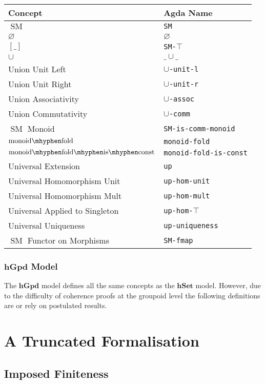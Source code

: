 \documentclass[12pt, parskip, DIV=14]{scrbook}
\newcommand{\SM}{\operatorname{SM}}
\newcommand{\hSet}{\mathbf{hSet}}
\newcommand{\hGpd}{\mathbf{hGpd}}
\newcommand{\monfold}{\operatorname{monoid\mhyphen fold}}
\newcommand{\monfoldconst}{\operatorname{monoid\mhyphen fold\mhyphen is\mhyphen const}}
\begin{document}
\begin{center}
\begin{tabular}{ll}
  Concept & Agda Name \\
  \hline
  $\SM$ & \texttt{SM} \\
  $\varnothing$ & $\varnothing$ \\
  $[\_]$ & \texttt{SM-$\top$} \\
  $\cup$ & $\_\cup\_$ \\
  Union Unit Left & \texttt{$\cup$-unit-l} \\
  Union Unit Right & \texttt{$\cup$-unit-r} \\
  Union Associativity & \texttt{$\cup$-assoc} \\
  Union Commutativity & \texttt{$\cup$-comm} \\
  $\SM$ Monoid & \texttt{SM-is-comm-monoid} \\
  $\monfold$ & \texttt{monoid-fold} \\
  $\monfoldconst$ & \texttt{monoid-fold-is-const} \\
  Universal Extension & \texttt{up} \\
  Universal Homomorphism Unit & \texttt{up-hom-unit} \\
  Universal Homomorphism Mult & \texttt{up-hom-mult} \\
  Universal Applied to Singleton & \texttt{up-hom-$\top$} \\
  Universal Uniqueness & \texttt{up-uniqueness} \\
  $\SM$ Functor on Morphisms & \texttt{SM-fmap}
\end{tabular}
\end{center}

\subsection{$\hGpd$ Model}

The $\hGpd$ model defines all the same concepts as the $\hSet$ model. However, due to the difficulty of coherence proofs at the groupoid level the following definitions are or rely on postulated results.

\chapter{A Truncated Formalisation}

\section{Imposed Finiteness}
\end{document}
